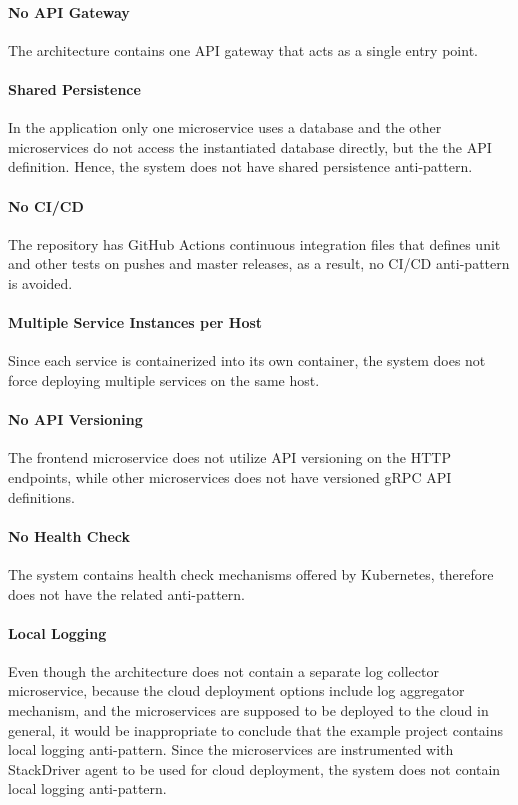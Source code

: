 \documentclass{Configuration_Files/PoliMi3i_thesis}
\begin{document}
\paragraph{No API Gateway} The architecture contains one API gateway that acts as a single entry point.

\paragraph{Shared Persistence} In the application only one microservice uses a database and the other microservices do not access the instantiated database directly, but the the API definition.
Hence, the system does not have shared persistence anti-pattern.

\paragraph{No CI/CD} The repository has GitHub Actions continuous integration files that defines unit and other tests on pushes and master releases, as a result, no CI/CD anti-pattern is avoided.

\paragraph{Multiple Service Instances per Host} Since each service is containerized into its own container, the system does not force deploying multiple services on the same host.

\paragraph{No API Versioning} The frontend microservice does not utilize API versioning on the HTTP endpoints, while other microservices does not have versioned gRPC API definitions.

\paragraph{No Health Check} The system contains health check mechanisms offered by Kubernetes, therefore does not have the related anti-pattern.

\paragraph{Local Logging} Even though the architecture does not contain a separate log collector microservice, because the cloud deployment options include log aggregator mechanism, and the microservices are supposed to be deployed to the cloud in general, it would be inappropriate to conclude that the example project contains local logging anti-pattern.
Since the microservices are instrumented with StackDriver agent to be used for cloud deployment, the system does not contain local logging anti-pattern.
\end{document}
